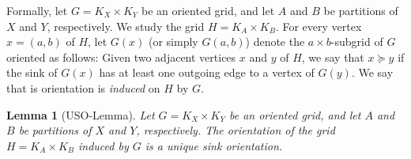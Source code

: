 \documentclass[a4paper,10pt]{article}
\newtheorem{lemma}{Lemma}
\begin{document}
Formally, let $G = K_X \times K_Y$ be an oriented grid,
and let $A$ and $B$ be partitions of $X$ and $Y$, respectively.
We study the grid $H = K_A \times K_B$.
For every vertex $x = (a,b)$ of $H$, let $G(x)$ (or simply $G(a,b)$)
denote the $a \times b$-subgrid of $G$ oriented as follows:
Given two adjacent vertices $x$ and $y$ of $H$, we say that $x\succeq y$ if the sink of $G(x)$ has at least one outgoing edge to a vertex of $G(y)$. We say that is orientation is \emph{induced} on $H$ by $G$.

\begin{lemma}[USO-Lemma]\label{lemma:USO-Lemma}
Let $G = K_X \times K_Y$ be an oriented grid,
and let $A$ and $B$ be partitions of $X$ and $Y$, respectively.
The orientation of the grid $H = K_A \times K_B$ induced by $G$ is a unique sink orientation.
\end{lemma}
\end{document}
